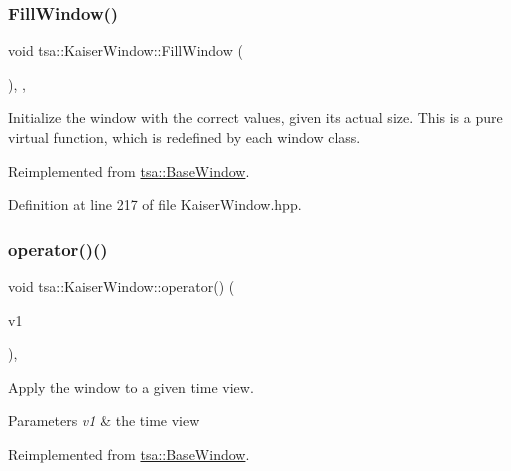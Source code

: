 \subsubsection{\texorpdfstring{Fill\+Window()}{FillWindow()}}
{\footnotesize\ttfamily void tsa\+::\+Kaiser\+Window\+::\+Fill\+Window (\begin{DoxyParamCaption}{ }\end{DoxyParamCaption})\hspace{0.3cm}{\ttfamily [inline]}, {\ttfamily [private]}, {\ttfamily [virtual]}}

Initialize the window with the correct values, given its actual size. This is a pure virtual function, which is redefined by each window class. 

Reimplemented from \hyperlink{classtsa_1_1_base_window_aa74b29105d94caa521d308198e8e6643}{tsa\+::\+Base\+Window}.



Definition at line 217 of file Kaiser\+Window.\+hpp.

\mbox{\label{classtsa_1_1_kaiser_window_a02d18a272d16d54fa4f7c9e8b227356e}} 
\subsubsection{\texorpdfstring{operator()()}{operator()()}\hspace{0.1cm}{\footnotesize\ttfamily [1/3]}}
{\footnotesize\ttfamily void tsa\+::\+Kaiser\+Window\+::operator() (\begin{DoxyParamCaption}\item[{\hyperlink{namespacetsa_ac599574bcc094eda25613724b8f3ca9e}{Seq\+View\+Double} \&}]{v1 }\end{DoxyParamCaption})\hspace{0.3cm}{\ttfamily [inline]}, {\ttfamily [virtual]}}

Apply the window to a given time view.


\begin{DoxyParams}{Parameters}
{\em v1} & the time view \\
\hline
\end{DoxyParams}


Reimplemented from \hyperlink{classtsa_1_1_base_window_a05d9edb95dc01840a1b2df78dfa3a8c1}{tsa\+::\+Base\+Window}.




